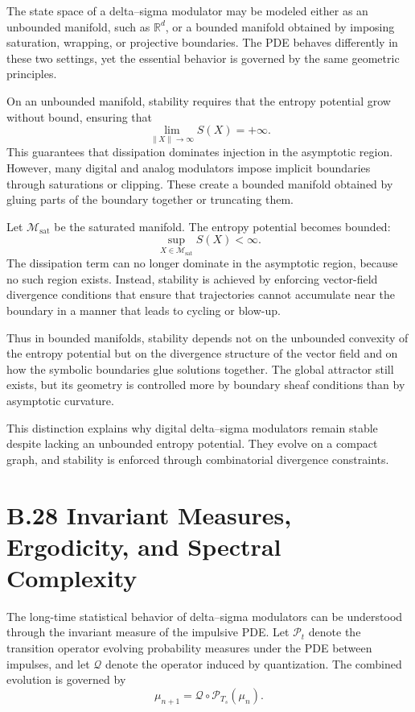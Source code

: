 The state space of a delta–sigma modulator may be modeled either as an unbounded manifold, such as \(\mathbb{R}^{d}\), or a bounded manifold obtained by imposing saturation, wrapping, or projective boundaries. The PDE behaves differently in these two settings, yet the essential behavior is governed by the same geometric principles.

On an unbounded manifold, stability requires that the entropy potential grow without bound, ensuring that 
\[
\lim_{\|X\|\to\infty} S(X) = +\infty.
\]
This guarantees that dissipation dominates injection in the asymptotic region. However, many digital and analog modulators impose implicit boundaries through saturations or clipping. These create a bounded manifold obtained by gluing parts of the boundary together or truncating them.

Let \(\mathcal{M}_{\mathrm{sat}}\) be the saturated manifold. The entropy potential becomes bounded:
\[
\sup_{X\in \mathcal{M}_{\mathrm{sat}}} S(X) < \infty.
\]
The dissipation term can no longer dominate in the asymptotic region, because no such region exists. Instead, stability is achieved by enforcing vector-field divergence conditions that ensure that trajectories cannot accumulate near the boundary in a manner that leads to cycling or blow-up.

Thus in bounded manifolds, stability depends not on the unbounded convexity of the entropy potential but on the divergence structure of the vector field and on how the symbolic boundaries glue solutions together. The global attractor still exists, but its geometry is controlled more by boundary sheaf conditions than by asymptotic curvature.

This distinction explains why digital delta–sigma modulators remain stable despite lacking an unbounded entropy potential. They evolve on a compact graph, and stability is enforced through combinatorial divergence constraints.

\section{B.28 Invariant Measures, Ergodicity, and Spectral Complexity}

The long-time statistical behavior of delta–sigma modulators can be understood through the invariant measure of the impulsive PDE. Let \(\mathcal{P}_{t}\) denote the transition operator evolving probability measures under the PDE between impulses, and let \(\mathcal{Q}\) denote the operator induced by quantization. The combined evolution is governed by
\[
\mu_{n+1} = \mathcal{Q}\circ \mathcal{P}_{T_{s}} (\mu_{n}).
\]

